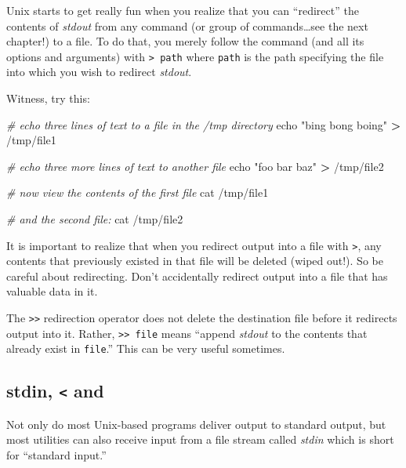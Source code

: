 \documentclass[]{krantz}
\makeatletter
\newenvironment{Shaded}{\begin{snugshade}}{\end{snugshade}}
\newcommand{\BuiltInTok}[1]{#1}
\newcommand{\CommentTok}[1]{\textcolor[rgb]{0.37,0.37,0.37}{\textit{#1}}}
\newcommand{\FunctionTok}[1]{\textcolor[rgb]{0,0,0}{#1}}
\newcommand{\NormalTok}[1]{#1}
\newcommand{\OperatorTok}[1]{\textcolor[rgb]{0.43,0.43,0.43}{\textbf{#1}}}
\newcommand{\StringTok}[1]{\textcolor[rgb]{0.5,0.5,0.5}{#1}}
\newenvironment{kframe}{%
\medskip{}
\setlength{\fboxsep}{.8em}
 \def\at@end@of@kframe{}%
 \ifinner\ifhmode%
  \def\at@end@of@kframe{\end{minipage}}%
  \begin{minipage}{\columnwidth}%
 \fi\fi%
 \def\FrameCommand##1{\hskip\@totalleftmargin \hskip-\fboxsep
 \colorbox{shadecolor}{##1}\hskip-\fboxsep
     \hskip-\linewidth \hskip-\@totalleftmargin \hskip\columnwidth}%
 \MakeFramed {\advance\hsize-\width
   \@totalleftmargin\z@ \linewidth\hsize
   \@setminipage}}%
 {\par\unskip\endMakeFramed%
 \at@end@of@kframe}
\renewenvironment{Shaded}{\begin{kframe}}{\end{kframe}}
\makeatother
\begin{document}
Unix starts to get really fun when you realize that you can ``redirect'' the
contents of \emph{stdout} from any command (or group of commands\ldots{}see the next chapter!)
to a file. To do that, you merely follow the command (and all its options and arguments)
with \texttt{\textgreater{}\ path} where \texttt{path} is the path specifying the file into which you
wish to redirect \emph{stdout}.

Witness, try this:

\begin{Shaded}
\begin{Highlighting}[]
\CommentTok{# echo three lines of text to a file in the /tmp directory}
\BuiltInTok{echo} \StringTok{"bing}
\StringTok{bong}
\StringTok{boing"} \OperatorTok{>}\NormalTok{ /tmp/file1}

\CommentTok{# echo three more lines of text to another file}
\BuiltInTok{echo} \StringTok{"foo}
\StringTok{bar}
\StringTok{baz"} \OperatorTok{>}\NormalTok{ /tmp/file2}

\CommentTok{# now view the contents of the first file}
\FunctionTok{cat}\NormalTok{ /tmp/file1}

\CommentTok{# and the second file:}
\FunctionTok{cat}\NormalTok{ /tmp/file2}
\end{Highlighting}
\end{Shaded}

It is important to realize that when you redirect output into a file
with \texttt{\textgreater{}}, any contents that previously existed in that file will
be deleted (wiped out!). So be careful about redirecting. Don't
accidentally redirect output into a file that has valuable data in it.

The \texttt{\textgreater{}\textgreater{}} redirection operator does not delete the destination file before
it redirects output into it. Rather, \texttt{\textgreater{}\textgreater{}\ file} means ``append \emph{stdout} to the contents that already exist in \texttt{file}.'' This can be very useful
sometimes.

\hypertarget{stdin-and}{%
\subsection{\texorpdfstring{stdin, \texttt{\textless{}} and \texttt{\textbar{}}}{stdin, \textless{} and \textbar{}}}\label{stdin-and}}

Not only do most Unix-based programs deliver output to standard output, but
most utilities can also receive input from a file stream called \emph{stdin} which
is short for ``standard input.''
\end{document}
